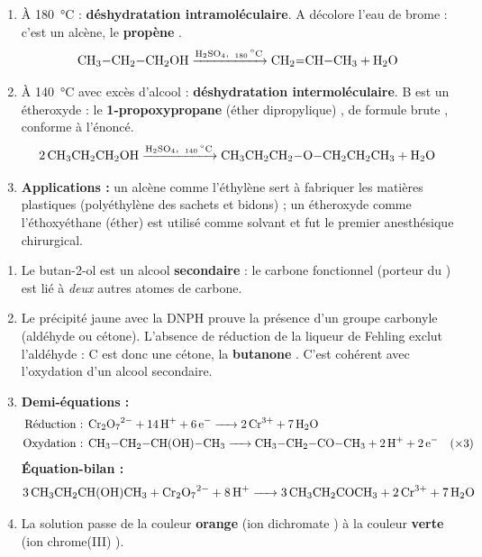 \documentclass[11pt]{article}
\newcommand{\cle}[1]{{\popxbold\color{popdark}#1}}
\begin{document}
\begin{corrige}
\begin{enumerate}
\item À \SI{180}{\celsius} : \textbf{déshydratation intramoléculaire}. A décolore l'eau de brome : c'est un \cle{alcène}, le \textbf{propène} .
\[ \ce{CH3-CH2-CH2OH ->[H2SO4,\ 180\,^\circ\mathrm{C}] CH2=CH-CH3 + H2O} \]
\item À \SI{140}{\celsius} avec excès d'alcool : \textbf{déshydratation intermoléculaire}. B est un \cle{étheroxyde} : le \textbf{1-propoxypropane} (éther dipropylique) , de formule brute , conforme à l'énoncé.
\[ \ce{2 CH3CH2CH2OH ->[H2SO4,\ 140\,^\circ\mathrm{C}] CH3CH2CH2-O-CH2CH2CH3 + H2O} \]
\item \textbf{Applications :} un alcène comme l'éthylène sert à fabriquer les matières plastiques (polyéthylène des sachets et bidons) ; un étheroxyde comme l'éthoxyéthane (éther) est utilisé comme solvant et fut le premier anesthésique chirurgical.
\end{enumerate}
\end{corrige}

\begin{corrige}
\begin{enumerate}
\item Le butan-2-ol  est un alcool \textbf{secondaire} : le carbone fonctionnel (porteur du ) est lié à \emph{deux} autres atomes de carbone.
\item Le précipité jaune avec la DNPH prouve la présence d'un \cle{groupe carbonyle}  (aldéhyde ou cétone). L'absence de réduction de la liqueur de Fehling exclut l'aldéhyde : C est donc une \cle{cétone}, la \textbf{butanone} . C'est cohérent avec l'oxydation d'un alcool secondaire.
\item \textbf{Demi-équations :}
\begin{align*}
\text{Réduction : } & \ce{Cr2O7^2- + 14 H+ + 6 e- -> 2 Cr^3+ + 7 H2O} \\
\text{Oxydation : } & \ce{CH3-CH2-CH(OH)-CH3 -> CH3-CH2-CO-CH3 + 2 H+ + 2 e-} \quad (\times 3)
\end{align*}
\textbf{Équation-bilan :}
\[ \ce{3 CH3CH2CH(OH)CH3 + Cr2O7^2- + 8 H+ -> 3 CH3CH2COCH3 + 2 Cr^3+ + 7 H2O} \]
\item La solution passe de la couleur \textbf{orange} (ion dichromate ) à la couleur \textbf{verte} (ion chrome(III) ).
\end{enumerate}
\end{corrige}
\end{document}
